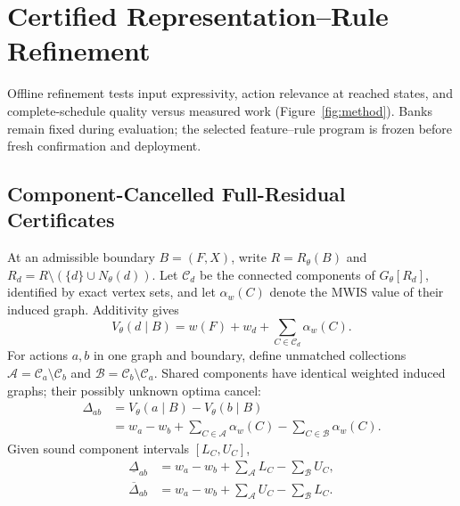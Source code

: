 \section{Certified Representation--Rule Refinement}
\label{sec:method}

Offline refinement tests input expressivity, action relevance at reached
states, and complete-schedule quality versus measured work
(Figure~\ref{fig:method}). Banks remain fixed during evaluation; the selected
feature--rule program is frozen before fresh confirmation and deployment.

\subsection{Component-Cancelled Full-Residual Certificates}
\label{sec:method:certificates}
At an admissible boundary $B=(F,X)$, write $R=R_\theta(B)$ and
$R_d=R\setminus(\{d\}\cup N_\theta(d))$. Let $\mathcal C_d$ be the
connected components of $G_\theta[R_d]$, identified by exact vertex sets,
and let $\alpha_w(C)$ denote the MWIS value of their induced graph.
Additivity gives
\begin{equation}
 V_\theta(d\mid B)=w(F)+w_d+\sum_{C\in\mathcal C_d}\alpha_w(C).
 \label{eq:component-completion}
\end{equation}
For actions $a,b$ in one graph and boundary, define unmatched
collections $\mathcal A=\mathcal C_a\setminus\mathcal C_b$ and
$\mathcal B=\mathcal C_b\setminus\mathcal C_a$. Shared components have
identical weighted induced graphs; their possibly unknown optima cancel:
\begin{equation}
 \begin{split}
 \Delta_{ab}&=V_\theta(a\mid B)-V_\theta(b\mid B)\\
 &=w_a-w_b+\sum_{C\in\mathcal A}\alpha_w(C)
             -\sum_{C\in\mathcal B}\alpha_w(C).
 \end{split}
 \label{eq:cancelled-difference}
\end{equation}
Given sound component intervals $[L_C,U_C]$,
\begin{equation}
 \begin{split}
 \underline\Delta_{ab}&=w_a-w_b+\sum_{\mathcal A}L_C-\sum_{\mathcal B}U_C,\\
 \overline\Delta_{ab}&=w_a-w_b+\sum_{\mathcal A}U_C-\sum_{\mathcal B}L_C.
 \end{split}
 \label{eq:difference-envelope}
\end{equation}
